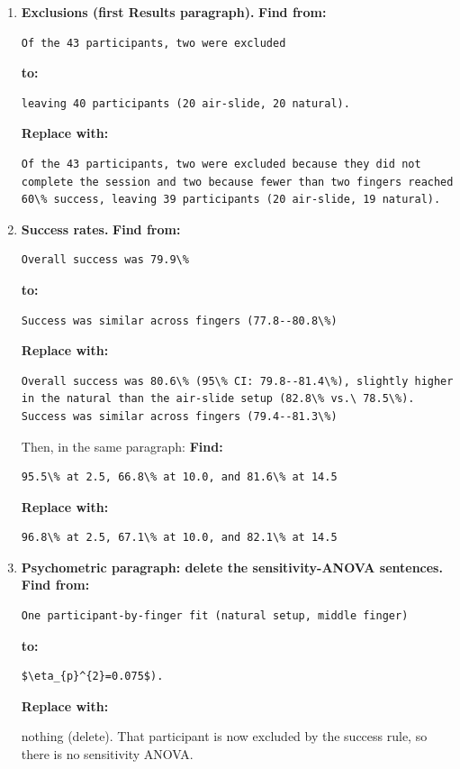 \documentclass[11pt,a4paper]{article}
\newcommand{\replace}{\noindent\textbf{Replace with:}\par\nopagebreak}
\begin{document}
\begin{enumerate}[resume]
\item \textbf{Exclusions (first Results paragraph).}
\noindent\textbf{Find from:}\begin{lstlisting}
Of the 43 participants, two were excluded
\end{lstlisting}
\noindent\textbf{to:}\begin{lstlisting}
leaving 40 participants (20 air-slide, 20 natural).
\end{lstlisting}
\replace
\begin{lstlisting}
Of the 43 participants, two were excluded because they did not complete the session and two because fewer than two fingers reached 60\% success, leaving 39 participants (20 air-slide, 19 natural).
\end{lstlisting}

\item \textbf{Success rates.}
\noindent\textbf{Find from:}\begin{lstlisting}
Overall success was 79.9\%
\end{lstlisting}
\noindent\textbf{to:}\begin{lstlisting}
Success was similar across fingers (77.8--80.8\%)
\end{lstlisting}
\replace
\begin{lstlisting}
Overall success was 80.6\% (95\% CI: 79.8--81.4\%), slightly higher in the natural than the air-slide setup (82.8\% vs.\ 78.5\%). Success was similar across fingers (79.4--81.3\%)
\end{lstlisting}
Then, in the same paragraph:
\noindent\textbf{Find:}\begin{lstlisting}
95.5\% at 2.5, 66.8\% at 10.0, and 81.6\% at 14.5
\end{lstlisting}
\replace
\begin{lstlisting}
96.8\% at 2.5, 67.1\% at 10.0, and 82.1\% at 14.5
\end{lstlisting}

\item \textbf{Psychometric paragraph: delete the sensitivity-ANOVA sentences.}
\noindent\textbf{Find from:}\begin{lstlisting}
One participant-by-finger fit (natural setup, middle finger)
\end{lstlisting}
\noindent\textbf{to:}\begin{lstlisting}
$\eta_{p}^{2}=0.075$).
\end{lstlisting}
\replace nothing (delete). That participant is now excluded by the success rule, so there is no sensitivity ANOVA.


\end{enumerate}
\end{document}
